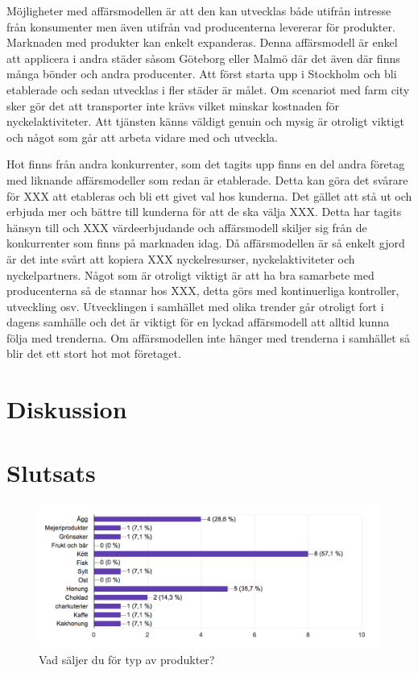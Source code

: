 \documentclass[10pt,a4paper,oneside]{article}
\begin{document}
Möjligheter med affärsmodellen är att den kan utvecklas både utifrån intresse från konsumenter men även utifrån vad producenterna levererar för produkter. Marknaden med produkter kan enkelt expanderas. Denna affärsmodell är enkel att applicera i andra städer såsom Göteborg eller Malmö där det även där finns många bönder och andra producenter. Att först starta upp i Stockholm och bli etablerade och sedan utvecklas i fler städer är målet. Om scenariot med farm city sker gör det att transporter inte krävs vilket minskar kostnaden för nyckelaktiviteter. Att tjänsten känns väldigt genuin och mysig är otroligt viktigt och något som går att arbeta vidare med och utveckla.  

Hot finns från andra konkurrenter, som det tagits upp finns en del andra företag med liknande affärsmodeller som redan är etablerade. Detta kan göra det svårare för XXX att etableras och bli ett givet val hos kunderna. Det gället att stå ut och erbjuda mer och bättre till kunderna för att de ska välja XXX. Detta har tagits hänsyn till och XXX värdeerbjudande och affärsmodell skiljer sig från de konkurrenter som finns på marknaden idag. Då affärsmodellen är så enkelt gjord är det inte svårt att kopiera XXX nyckelresurser, nyckelaktiviteter och nyckelpartners. Något som är otroligt viktigt är att ha bra samarbete med producenterna så de stannar hos XXX, detta görs med kontinuerliga kontroller, utveckling osv. Utvecklingen i samhället med olika trender går otroligt fort i dagens samhälle och det är viktigt för en lyckad affärsmodell att alltid kunna följa med trenderna. Om affärsmodellen inte hänger med trenderna i samhället så blir det ett stort hot mot företaget. 

\newpage

\section{Diskussion}
\newpage

\section{Slutsats}
\newpage



\newpage

\begin{figure}
	\includegraphics[scale=0.6]{1.png}
	\caption{Vad s\"aljer du f\"or typ av produkter?}
\end{figure}
\end{document}

